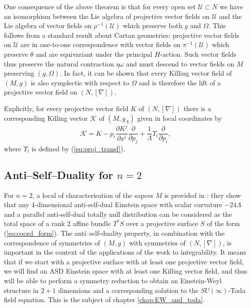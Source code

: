One consequence of the above theorem is that for every open set $\mathcal{U}\subset N$
we have an isomorphism between the Lie algebra of projective vector
fields on $\mathcal{U}$ and the Lie algebra of vector fields on $\rho^{-1}(\mathcal{U})$
which preserve both $g$ and $\Omega$. This follows from a standard
result about Cartan geometries: projective vector fields on $\mathcal{U}$
are in one-to-one correspondence with vector fields on $\pi^{-1}(\mathcal{U})$
which preserve $\theta$ and are equivariant under the principal $H$-action.
Such vector fields thus preserve the natural contraction $\eta\omega$
and must descend to vector fields on $M$ preserving $(g,\Omega)$.
In fact, it can be shown that every Killing vector field of $(M,g)$
is also symplectic with respect to $\Omega$ and is therefore the
lift of a projective vector field on $(N,[\nabla])$.

Explicitly, for every projective vector field $K$ of $(N,[\nabla])$
there is a corresponding Killing vector $\mathcal{K}$ of $(M,g_{\Lambda})$
given in local coordinates by 
\begin{equation}
\mathcal{K}=K-p_{i}\frac{\partial K^{j}}{\partial x^{i}}\frac{\partial}{\partial p_{j}}+\frac{1}{\Lambda}\Upsilon_{i}\frac{\partial}{\partial p_{i}},\label{eq:kvf_from_pvf}
\end{equation}
where $\Upsilon_{i}$ is defined by (\ref{eq:proj_transf}).

\subsection{Anti--Self--Duality for $n=2$}
For $n=2$, a local of characterisation of the sapces $M$ is provided in
\cite{DM}: they show that any 4-dimensional anti-self-dual
Einstein space with scalar curvature $-24\Lambda$ and a parallel
anti-self-dual totally null distribution can be considered as the
total space of a rank 2 affine bundle $T^{*}S$ over a projective
surface $S$ of the form (\ref{eq:coord_form}). The anti--self-duality property, in combination with the correspondence of symmetries of $(M,g)$ with symmetries of $(N,[\nabla])$, is important in the context of the applications of
the work \cite{DM} to integrability. It means that
if we start with a projective surface with at least one projective
vector field, we will find an ASD Einstein space with at least one
Killing vector field, and thus will be able to perform a symmetry
reduction to obtain an Einstein-Weyl structure in $2+1$ dimensions
and a corresponding solution to the $SU(\infty)$-Toda field equation. This is the subject of chapter \ref{chap:EW_and_toda}.
